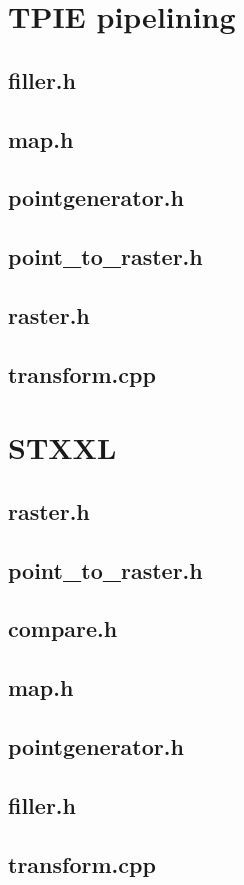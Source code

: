 \documentclass[article,twoside,a4paper]{memoir}
\begin{document}
\pagestyle{ruled}

\newcommand{\codetitle}[1]{\section{\textsf{#1}}}
\newcommand{\codebody}[3]{}

\newcommand{\code}[4]{%
  \codetitle{#2}
  \codebody{#1}{#3}{#4}
}

\chapter{TPIE pipelining}
\code{tpie/filler.h}{filler.h}{11}{51}
\code{tpie/map.h}{map.h}{9}{42}
\code{tpie/pointgenerator.h}{pointgenerator.h}{6}{34}
\clearpage
\code{tpie/point_to_raster.h}{point\_to\_raster.h}{11}{49}
\code{tpie/raster.h}{raster.h}{8}{68}
\clearpage
\codetitle{transform.cpp}
\codebody{tpie/transform.cpp}{16}{23}
\codebody{tpie/transform.cpp}{51}{76}

\clearpage
\chapter{STXXL}
\code{stxxl/raster.h}{raster.h}{10}{63}
\clearpage
\code{stxxl/point_to_raster.h}{point\_to\_raster.h}{7}{56}
\clearpage
\code{stxxl/compare.h}{compare.h}{7}{43}
\code{stxxl/map.h}{map.h}{7}{48}
\code{stxxl/pointgenerator.h}{pointgenerator.h}{6}{33}
\clearpage
\code{stxxl/filler.h}{filler.h}{7}{54}
\clearpage
\codetitle{transform.cpp}
\codebody{stxxl/transform.cpp}{17}{24}
\codebody{stxxl/transform.cpp}{52}{99}
\end{document}
